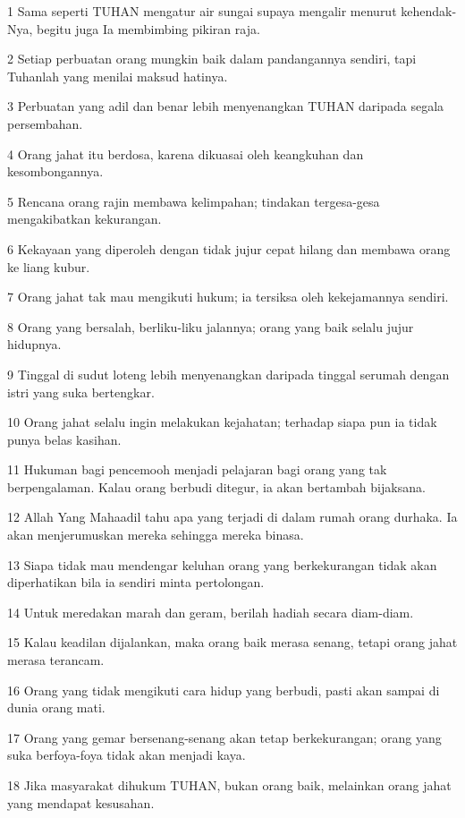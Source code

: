 \par 1 Sama seperti TUHAN mengatur air sungai supaya mengalir menurut kehendak-Nya, begitu juga Ia membimbing pikiran raja.
\par 2 Setiap perbuatan orang mungkin baik dalam pandangannya sendiri, tapi Tuhanlah yang menilai maksud hatinya.
\par 3 Perbuatan yang adil dan benar lebih menyenangkan TUHAN daripada segala persembahan.
\par 4 Orang jahat itu berdosa, karena dikuasai oleh keangkuhan dan kesombongannya.
\par 5 Rencana orang rajin membawa kelimpahan; tindakan tergesa-gesa mengakibatkan kekurangan.
\par 6 Kekayaan yang diperoleh dengan tidak jujur cepat hilang dan membawa orang ke liang kubur.
\par 7 Orang jahat tak mau mengikuti hukum; ia tersiksa oleh kekejamannya sendiri.
\par 8 Orang yang bersalah, berliku-liku jalannya; orang yang baik selalu jujur hidupnya.
\par 9 Tinggal di sudut loteng lebih menyenangkan daripada tinggal serumah dengan istri yang suka bertengkar.
\par 10 Orang jahat selalu ingin melakukan kejahatan; terhadap siapa pun ia tidak punya belas kasihan.
\par 11 Hukuman bagi pencemooh menjadi pelajaran bagi orang yang tak berpengalaman. Kalau orang berbudi ditegur, ia akan bertambah bijaksana.
\par 12 Allah Yang Mahaadil tahu apa yang terjadi di dalam rumah orang durhaka. Ia akan menjerumuskan mereka sehingga mereka binasa.
\par 13 Siapa tidak mau mendengar keluhan orang yang berkekurangan tidak akan diperhatikan bila ia sendiri minta pertolongan.
\par 14 Untuk meredakan marah dan geram, berilah hadiah secara diam-diam.
\par 15 Kalau keadilan dijalankan, maka orang baik merasa senang, tetapi orang jahat merasa terancam.
\par 16 Orang yang tidak mengikuti cara hidup yang berbudi, pasti akan sampai di dunia orang mati.
\par 17 Orang yang gemar bersenang-senang akan tetap berkekurangan; orang yang suka berfoya-foya tidak akan menjadi kaya.
\par 18 Jika masyarakat dihukum TUHAN, bukan orang baik, melainkan orang jahat yang mendapat kesusahan.

